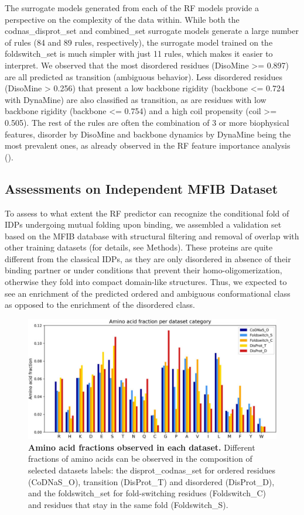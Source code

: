 The surrogate models generated from each of the RF models provide a perspective on the complexity of the data within. While both the codnas_disprot_set and combined_set surrogate models generate a large number of rules (84 and 89 rules, respectively), the surrogate model trained on the foldswitch_set is much simpler with just 11 rules, which makes it easier to interpret. We observed that the most disordered residues (DisoMine >= 0.897) are all predicted as transition (ambiguous behavior). Less disordered residues (DisoMine > 0.256) that present a low backbone rigidity (backbone <= 0.724 with DynaMine) are also classified as transition, as are residues with low backbone rigidity (backbone <= 0.754) and a high coil propensity (coil >= 0.505). The rest of the rules are often the combination of 3 or more biophysical features, disorder by DisoMine and backbone dynamics by DynaMine being the most prevalent ones, as already observed in the RF feature importance analysis ().


\subsection{Assessments on Independent MFIB Dataset}

To assess to what extent the RF predictor can recognize the conditional fold of IDPs undergoing mutual folding upon binding, we assembled a validation set based on the MFIB database \cite{ficho_mfib_2017} with structural filtering and removal of overlap with other training datasets (for details, see Methods). These proteins are quite different from the classical IDPs, as they are only disordered in absence of their binding partner or under conditions that prevent their homo-oligomerization, otherwise they fold into compact domain-like structures. Thus, we expected to see an enrichment of the predicted ordered and ambiguous conformational class as opposed to the enrichment of the disordered class.

\begin{figure}[tbh]
    \centering
    \includegraphics[width=\linewidth]{ambiguous//figures_ambiguous/fig3.pdf}
    \caption{\textbf{Amino acid fractions observed in each dataset.} Different fractions of amino acids can be observed in the composition of selected datasets labels: the disprot_codnas_set for ordered residues (CoDNaS_O), transition (DisProt_T) and disordered (DisProt_D), and the foldswitch_set for fold-switching residues (Foldswitch_C) and residues that stay in the same fold (Foldswitch_S).}
    \label{fig:chapter5:fig3}
\end{figure}

